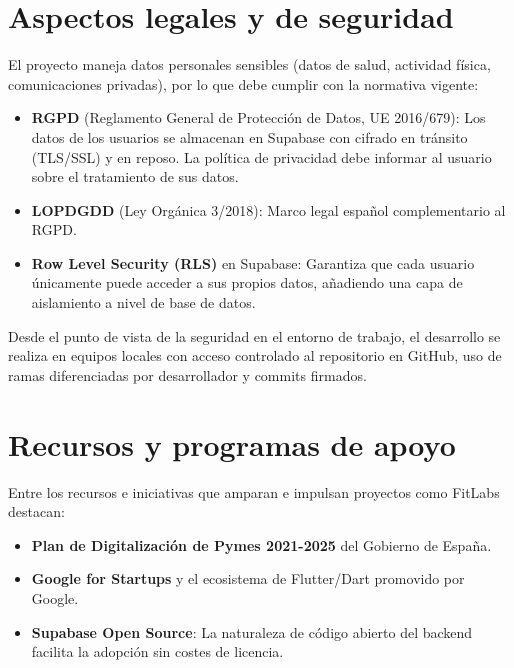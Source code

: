 \section{Aspectos legales y de seguridad}

El proyecto maneja datos personales sensibles (datos de salud, actividad física, comunicaciones privadas), por lo que debe cumplir con la normativa vigente:

\begin{itemize}
  \item \textbf{RGPD} (Reglamento General de Protección de Datos, UE 2016/679): Los datos de los usuarios se almacenan en Supabase con cifrado en tránsito (TLS/SSL) y en reposo. La política de privacidad debe informar al usuario sobre el tratamiento de sus datos.
  \item \textbf{LOPDGDD} (Ley Orgánica 3/2018): Marco legal español complementario al RGPD.
  \item \textbf{Row Level Security (RLS)} en Supabase: Garantiza que cada usuario únicamente puede acceder a sus propios datos, añadiendo una capa de aislamiento a nivel de base de datos.
\end{itemize}

Desde el punto de vista de la seguridad en el entorno de trabajo, el desarrollo se realiza en equipos locales con acceso controlado al repositorio en GitHub, uso de ramas diferenciadas por desarrollador y commits firmados.

\section{Recursos y programas de apoyo}

Entre los recursos e iniciativas que amparan e impulsan proyectos como FitLabs destacan:

\begin{itemize}
  \item \textbf{Plan de Digitalización de Pymes 2021-2025} del Gobierno de España.
  \item \textbf{Google for Startups} y el ecosistema de Flutter/Dart promovido por Google.
  \item \textbf{Supabase Open Source}: La naturaleza de código abierto del backend facilita la adopción sin costes de licencia.
\end{itemize}
